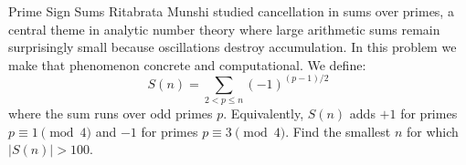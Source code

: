 \begin{problem}{Prime Sign Sums}
    Ritabrata Munshi studied cancellation in sums over primes, a central theme in analytic number theory where large arithmetic sums remain surprisingly small because oscillations destroy accumulation. In this problem we make that phenomenon concrete and computational. We define:
    \[
    S(n) = \sum_{2 < p \leq n} (-1)^{(p-1)/2}
    \]
    where the sum runs over odd primes \(p\). Equivalently, \(S(n)\) adds \(+1\) for primes \(p \equiv 1 \pmod{4}\) and \(-1\) for primes \(p \equiv 3 \pmod{4}\). Find the smallest \(n\) for which \(|S(n)| > 100\).
    
\end{problem}
